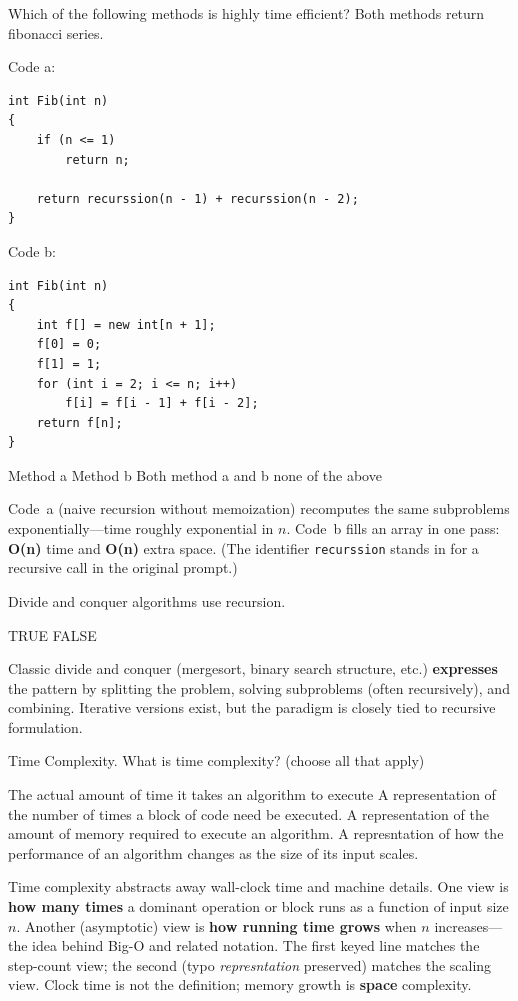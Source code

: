 \question[4]
Which of the following methods is highly time efficient? Both methods return fibonacci series.

\noindent Code a:
\begin{lstlisting}[style=java]
int Fib(int n)
{
    if (n <= 1)
        return n;

    return recurssion(n - 1) + recurssion(n - 2);
}
\end{lstlisting}

\noindent Code b:
\begin{lstlisting}[style=java]
int Fib(int n)
{
    int f[] = new int[n + 1];
    f[0] = 0;
    f[1] = 1;
    for (int i = 2; i <= n; i++)
        f[i] = f[i - 1] + f[i - 2];
    return f[n];
}
\end{lstlisting}
\begin{choices}
  \choice Method a
  \CorrectChoice Method b
  \choice Both method a and b
  \choice none of the above
\end{choices}
\begin{solution}
  Code~a (naive recursion without memoization) recomputes the same subproblems exponentially---time roughly exponential in $n$. Code~b fills an array in one pass: \textbf{O(n)} time and \textbf{O(n)} extra space. (The identifier \texttt{recurssion} stands in for a recursive call in the original prompt.)
\end{solution}

\question[4]
Divide and conquer algorithms use recursion.
\begin{choices}
  \CorrectChoice TRUE
  \choice FALSE
\end{choices}
\begin{solution}
  Classic divide and conquer (mergesort, binary search structure, etc.) \textbf{expresses} the pattern by splitting the problem, solving subproblems (often recursively), and combining. Iterative versions exist, but the paradigm is closely tied to recursive formulation.
\end{solution}

\question[4]
Time Complexity. What is time complexity? (choose all that apply)
\begin{checkboxes}
  \choice The actual amount of time it takes an algorithm to execute
  \CorrectChoice A representation of the number of times a block of code need be executed.
  \choice A representation of the amount of memory required to execute an algorithm.
  \CorrectChoice A represntation of how the performance of an algorithm changes as the size of its input scales.
\end{checkboxes}
\begin{solution}
  Time complexity abstracts away wall-clock time and machine details. One view is \textbf{how many times} a dominant operation or block runs as a function of input size $n$. Another (asymptotic) view is \textbf{how running time grows} when $n$ increases---the idea behind Big-O and related notation. The first keyed line matches the step-count view; the second (typo \textit{represntation} preserved) matches the scaling view. Clock time is not the definition; memory growth is \textbf{space} complexity.
\end{solution}

